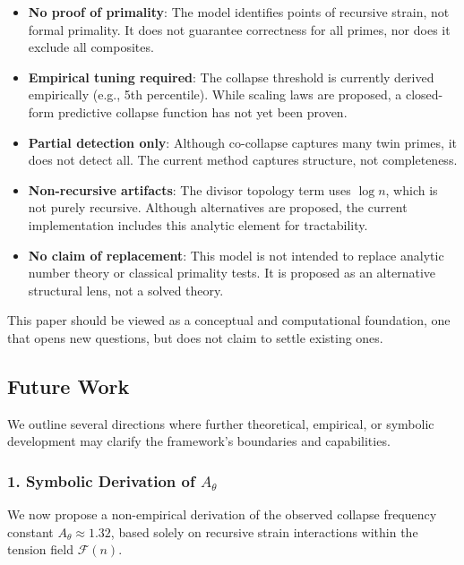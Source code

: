\documentclass[11pt]{article}
\begin{document}
\begin{itemize}
  \item \textbf{No proof of primality}: The model identifies points of recursive strain, not formal primality. It does not guarantee correctness for all primes, nor does it exclude all composites.
  
  \item \textbf{Empirical tuning required}: The collapse threshold is currently derived empirically (e.g., 5th percentile). While scaling laws are proposed, a closed-form predictive collapse function has not yet been proven.

  \item \textbf{Partial detection only}: Although co-collapse captures many twin primes, it does not detect all. The current method captures structure, not completeness.

  \item \textbf{Non-recursive artifacts}: The divisor topology term uses \(\log n\), which is not purely recursive. Although alternatives are proposed, the current implementation includes this analytic element for tractability.

  \item \textbf{No claim of replacement}: This model is not intended to replace analytic number theory or classical primality tests. It is proposed as an alternative structural lens, not a solved theory.
\end{itemize}

This paper should be viewed as a conceptual and computational foundation, one that opens new questions, but does not claim to settle existing ones.


\subsection{Future Work}

We outline several directions where further theoretical, empirical, or symbolic development may clarify the framework's boundaries and capabilities.

\subsubsection*{1. Symbolic Derivation of \( A_\theta \)}

We now propose a non-empirical derivation of the observed collapse frequency constant \( A_\theta \approx 1.32 \), based solely on recursive strain interactions within the tension field \( \mathcal{F}(n) \).
\end{document}
